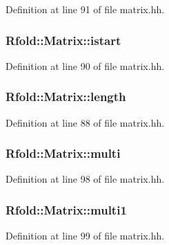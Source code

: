 Definition at line 91 of file matrix.\+hh.

\hypertarget{class_rfold_1_1_matrix_a5880f2f8bd4be305049d3149334370e7}{
\subsubsection[{istart}]{ Rfold\+::\+Matrix\+::istart}}\label{class_rfold_1_1_matrix_a5880f2f8bd4be305049d3149334370e7}


Definition at line 90 of file matrix.\+hh.

\hypertarget{class_rfold_1_1_matrix_a4e28e0237e378feced3ce0497b0280d3}{
\subsubsection[{length}]{ Rfold\+::\+Matrix\+::length}}\label{class_rfold_1_1_matrix_a4e28e0237e378feced3ce0497b0280d3}


Definition at line 88 of file matrix.\+hh.

\hypertarget{class_rfold_1_1_matrix_aae63edf0279f08764bf31766c2015daf}{
\subsubsection[{multi}]{ Rfold\+::\+Matrix\+::multi}}\label{class_rfold_1_1_matrix_aae63edf0279f08764bf31766c2015daf}


Definition at line 98 of file matrix.\+hh.

\hypertarget{class_rfold_1_1_matrix_a60276112ff38bf30f411846caa101ad4}{
\subsubsection[{multi1}]{ Rfold\+::\+Matrix\+::multi1}}\label{class_rfold_1_1_matrix_a60276112ff38bf30f411846caa101ad4}


Definition at line 99 of file matrix.\+hh.

